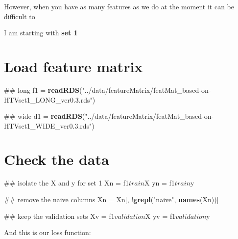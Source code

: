 \documentclass[10pt]{report}
\newenvironment{Shaded}{}{}
\newcommand{\KeywordTok}[1]{\textcolor[rgb]{0.00,0.44,0.13}{\textbf{{#1}}}}
\newcommand{\StringTok}[1]{\textcolor[rgb]{0.25,0.44,0.63}{{#1}}}
\newcommand{\NormalTok}[1]{{#1}}
\begin{document}
However, when you have as many features as we do at the moment it can be
difficult to

I am starting with \textbf{set 1}

\section{Load feature matrix}\label{load-feature-matrix}

\begin{Shaded}
\begin{Highlighting}[]
\NormalTok{## long}
\NormalTok{f1 =}\StringTok{ }\KeywordTok{readRDS}\NormalTok{(}\StringTok{"../data/featureMatrix/featMat_based-on-HTVset1_LONG_ver0.3.rds"}\NormalTok{)}

\NormalTok{## wide}
\NormalTok{d1 =}\StringTok{ }\KeywordTok{readRDS}\NormalTok{(}\StringTok{"../data/featureMatrix/featMat_based-on-HTVset1_WIDE_ver0.3.rds"}\NormalTok{)}
\end{Highlighting}
\end{Shaded}

\section{Check the data}\label{check-the-data}

\begin{Shaded}
\begin{Highlighting}[]
\NormalTok{## isolate the X and y for set 1}
\NormalTok{Xn =}\StringTok{ }\NormalTok{f1$train$X}
\NormalTok{yn =}\StringTok{ }\NormalTok{f1$train$y}

\NormalTok{## remove the naive columns}
\NormalTok{Xn =}\StringTok{ }\NormalTok{Xn[, !}\KeywordTok{grepl}\NormalTok{(}\StringTok{"naive"}\NormalTok{, }\KeywordTok{names}\NormalTok{(Xn))]}

\NormalTok{## keep the validation sets}
\NormalTok{Xv =}\StringTok{ }\NormalTok{f1$validation$X}
\NormalTok{yv =}\StringTok{ }\NormalTok{f1$validation$y}
\end{Highlighting}
\end{Shaded}

And this is our loss function:
\end{document}
